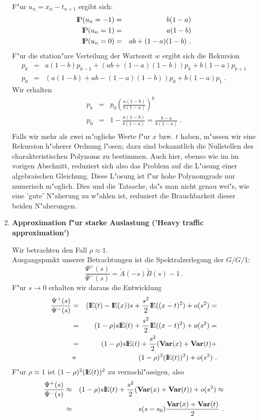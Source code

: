 \begin{enumerate}
F"ur $u_{n}=x_{n}-t_{n+1}$ ergibt sich:
\begin{eqnarray*}
   {\rm I\kern-0.2em P}(u_{n}=-1)&=&b(1-a) \\
   {\rm I\kern-0.2em P}(u_{n}=1)&=&a(1-b) \\
   {\rm I\kern-0.2em P}(u_{n}=0)&=&ab+(1-a)(1-b) ~.
\end{eqnarray*}
F"ur die station"are Verteilung der Wartezeit $w$ ergibt sich die Rekursion
\begin{eqnarray*}
  p_{k}&=&a(1-b)p_{k-1}+(ab+(1-a)(1-b))p_{k}+b(1-a)p_{k+1} \\
  p_{0}&=&(a(1-b)+ab-(1-a)(1-b))p_{0}+b(1-a)p_{1} ~. 
\end{eqnarray*} 
Wir erhalten
\begin{eqnarray*}
  p_{k}&=&p_{0}\left( \frac{a(1-b)}{b(1-a)}\right)^{k} \\
  p_{0}&=&1-\frac{a(1-b)}{b(1-a)}=\frac{b-a}{b(1-a)} ~.\\
\end{eqnarray*}
Falls wir mehr als zwei m"ogliche Werte f"ur $x$ bzw. $t$ haben, m"ussen wir eine Rekursion h"oherer Ordnung l"osen; dazu sind bekanntlich die Nullstellen des
charakteristischen Polynoms zu bestimmen. Auch hier, ebenso wie im im vorigen Abschnitt, reduziert sich also das Problem auf die L"osung einer algebraischen
Gleichung. Diese L"osung ist f"ur hohe Polynomgrade nur numerisch m"oglich. Dies und die Tatsache, da"s man nicht genau wei"s, wie eine 'gute' N"aherung zu
w"ahlen
ist, reduziert die Brauchbarkeit dieser beiden N"aherungen.

\item {\bf Approximation f"ur starke Auslastung ('Heavy traffic approximation')}

Wir betrachten den Fall $\rho \approx 1$. \\
Ausgangspunkt unserer Betrachtungen ist die Spektralzerlegung der $G/G/1$:
\[\frac{\Psi^{+}(s)}{\Psi^{-}(s)}=\tilde A (-s)\tilde B (s)-1 ~.\]
F"ur $s \rightarrow 0$ erhalten wir daraus die Entwicklung
\begin{eqnarray*}
  \frac{\Psi^{+}(s)}{\Psi^{-}(s)}&=&({\rm I\kern-0.2em E}(t)-{\rm I\kern-0.2em E}(x))s+\frac{s^{2}}{2}{\rm I\kern-0.2em E}((x-t)^{2})+o(s^{2})= \\   
                                 &=&(1-\rho)s{\rm I\kern-0.2em E}(t)+\frac{s^{2}}{2}{\rm I\kern-0.2em E}((x-t)^{2})+o(s^{2})=  \\
                                 &=&(1-\rho)s{\rm I\kern-0.2em E}(t)+\frac{s^{2}}{2}({\bf Var}(x)+{\bf Var}(t)+ \\
                                 &+&(1-\rho)^{2}({\rm I\kern-0.2em E}(t))^{2}) + o(s^{2}) ~.
\end{eqnarray*}
F"ur $\rho \approx 1$ ist $(1-\rho)^{2}({\rm I\kern-0.2em E}(t))^{2}$ zu vernachl"assigen, also
\begin{eqnarray*}
  \frac{\Psi^{+}(s)}{\Psi^{-}(s)}&\approx&(1-\rho)s{\rm I\kern-0.2em E}(t)+\frac{s^{2}}{2}({\bf Var}(x)+{\bf Var}(t))+o(s^{2}) \approx \\
  &\approx&s(s-s_{0}) \frac{{\bf Var}(x)+{\bf Var}(t)}{2} ~.
\end{eqnarray*}


\end{enumerate}
